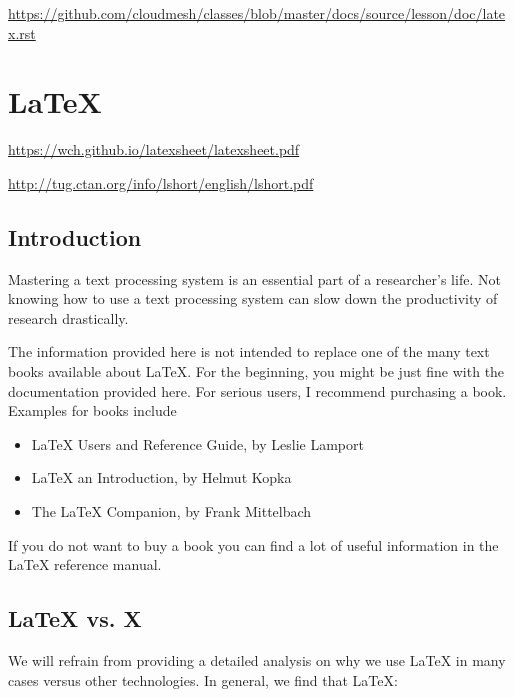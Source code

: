 \begin{fileremark}\url{https://github.com/cloudmesh/classes/blob/master/docs/source/lesson/doc/latex.rst}\end{fileremark}
\section{LaTeX}\label{latex}


\url{https://wch.github.io/latexsheet/latexsheet.pdf}

\url{http://tug.ctan.org/info/lshort/english/lshort.pdf}


\subsection{Introduction}\label{introduction}

Mastering a text processing system is an essential part of a
researcher's life. Not knowing how to use a text processing system can
slow down the productivity of research drastically.

The information provided here is not intended to replace one of the many
text books available about LaTeX. For the beginning, you might be just
fine with the documentation provided here. For serious users, I
recommend purchasing a book. Examples for books include

\begin{itemize}
\tightlist
\item
  LaTeX Users and Reference Guide, by Leslie Lamport
\item
  LaTeX an Introduction, by Helmut Kopka
\item
  The LaTeX Companion, by Frank Mittelbach
\end{itemize}

If you do not want to buy a book you can find a lot of useful
information in the LaTeX reference manual.

\subsection{LaTeX vs. X}\label{latex-vs.-x}

We will refrain from providing a detailed analysis on why we use LaTeX
in many cases versus other technologies. In general, we find that LaTeX:

